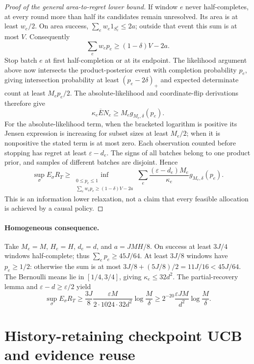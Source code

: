 \begin{proof}[Proof of the general area-to-regret lower bound]
If window $e$ never half-completes, at every round more than half its
candidates remain unresolved. Its area is at least $w_e/2$. On area success,
$\sum_ew_e1_{S_e^c}\le2a$; outside that event this sum is at most $V$.
Consequently
\[
 \sum_ew_ep_e\ge(1-\delta)V-2a.
\]
Stop batch $e$ at first half-completion or at its endpoint. The likelihood
argument above now intersects the product-posterior event with completion
probability $p_e$, giving intersection probability at least
$(p_e-2\delta)_+$ and expected determinate count at least $M_ep_e/2$.
The absolute-likelihood and coordinate-flip derivations therefore give
\[
 \kappa_e\overline EN_e\ge M_eg_{M_e,\delta}(p_e).
\]
For the absolute-likelihood term, when the bracketed logarithm is positive
its Jensen expression is increasing for subset sizes at least $M_e/2$;
when it is nonpositive the stated term is at most zero. Each observation
counted before stopping has regret at least $\varepsilon-d_e$.
The signs of all batches belong to one product prior, and samples of
different batches are disjoint. Hence
\[
 \sup_\sigma E_\sigma R_T\ge
 \inf_{\substack{0\le p_e\le1\\
       \sum_ew_ep_e\ge(1-\delta)V-2a}}
 \sum_e\frac{(\varepsilon-d_e)M_e}{\kappa_e}
                  g_{M_e,\delta}(p_e).
\]
This is an information lower relaxation, not a claim that every feasible
allocation is achieved by a causal policy.
\end{proof}

\paragraph{Homogeneous consequence.}
Take $M_e=M$, $H_e=H$, $d_e=d$, and $a=JMH/8$. On success at least $3J/4$
windows half-complete; thus $\sum_ep_e\ge45J/64$. At least $3J/8$ windows
have $p_e\ge1/2$: otherwise the sum is at most
$3J/8+(5J/8)/2=11J/16<45J/64$.
The Bernoulli means lie in $[1/4,3/4]$, giving $\kappa_e\le32d^2$.
The partial-recovery lemma and $\varepsilon-d\ge\varepsilon/2$ yield
\[
 \sup_\sigma E_\sigma R_T\ge
 \frac{3J}{8}\frac{\varepsilon M}{2\cdot1024\cdot32d^2}
             \log\frac M\delta
 \ge2^{-20}\frac{\varepsilon JM}{d^2}\log\frac M\delta.
\]

\section{History-retaining checkpoint UCB and evidence reuse}
\label{app:reuse}

